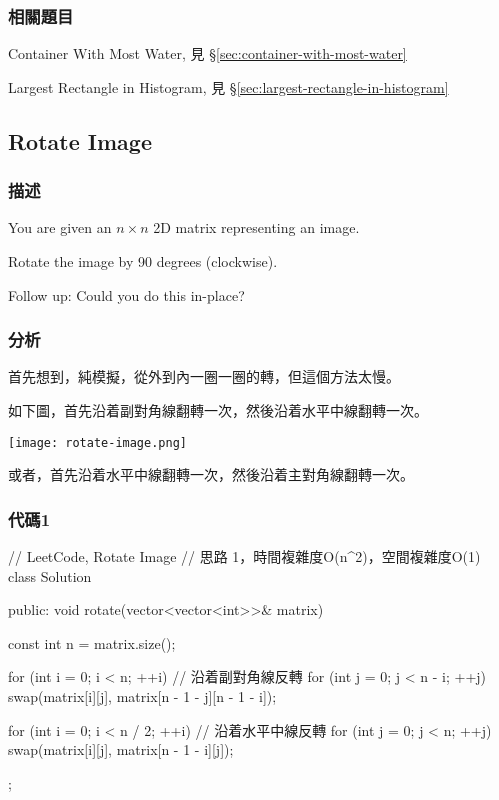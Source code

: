 \subsubsection{相關題目}
\begindot
\item Container With Most Water, 見 \S \ref{sec:container-with-most-water}
\item Largest Rectangle in Histogram, 見 \S \ref{sec:largest-rectangle-in-histogram}
\myenddot


\subsection{Rotate Image} %
\label{sec:rotate-image}


\subsubsection{描述}
You are given an $n \times n$ 2D matrix representing an image.

Rotate the image by 90 degrees (clockwise).

Follow up:
Could you do this in-place?


\subsubsection{分析}
首先想到，純模擬，從外到內一圈一圈的轉，但這個方法太慢。

如下圖，首先沿着副對角線翻轉一次，然後沿着水平中線翻轉一次。

\begin{center}
\texttt{[image: rotate-image.png]}\\
\label{fig:rotate-image}
\end{center}

或者，首先沿着水平中線翻轉一次，然後沿着主對角線翻轉一次。


\subsubsection{代碼1}
\begin{Code}
// LeetCode, Rotate Image
// 思路 1，時間複雜度O(n^2)，空間複雜度O(1)
class Solution {
public:
    void rotate(vector<vector<int>>& matrix) {
        const int n = matrix.size();

        for (int i = 0; i < n; ++i)  // 沿着副對角線反轉
            for (int j = 0; j < n - i; ++j)
                swap(matrix[i][j], matrix[n - 1 - j][n - 1 - i]);

        for (int i = 0; i < n / 2; ++i) // 沿着水平中線反轉
            for (int j = 0; j < n; ++j)
                swap(matrix[i][j], matrix[n - 1 - i][j]);
    }
};
\end{Code}

